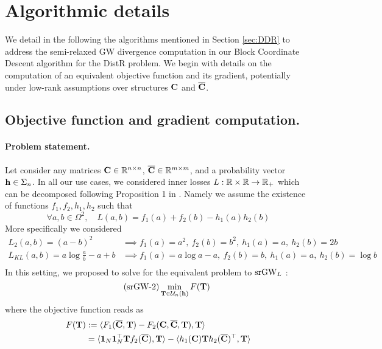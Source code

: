 \section{Algorithmic details}\label{sec:algorithms}

We detail in the following the algorithms mentioned in Section \ref{sec:DDR} to address the semi-relaxed GW divergence computation in our Block Coordinate Descent algorithm for the DistR problem. We begin with details on the computation of an equivalent objective function and its gradient, potentially under low-rank assumptions over structures ${\mathbf{C}}$ and $\overline{{\mathbf{C}}}$.

\subsection{Objective function and gradient computation.}\label{subsec:GWloss} 

\paragraph{Problem statement.} Let consider any matrices ${\mathbf{C}} \in \mathbb{R}^{n \times n}$, $\overline{{\mathbf{C}}} \in \mathbb{R}^{m \times m}$, and a probability vector ${\mathbf{h}} \in \Sigma_n$. In all our use cases,  we considered inner losses $L: \mathbb{R} \times \mathbb{R} \rightarrow \mathbb{R}_+$ which can be decomposed following Proposition 1 in \cite{peyre2016gromov}. Namely we assume the existence of functions $f_1, f_2, h_1, h_2$ such that 
\begin{equation}\label{eq:loss_decomposition}
\forall a, b \in \Omega^2, \quad L(a, b) = f_1(a) + f_2(b) - h_1(a) h_2(b)
\end{equation}
More specifically we considered
\begin{equation} \tag{L2}\label{eq:L2_loss}
\begin{split}
	L_2(a,b) = (a-b)^2 &\implies f_1(a) = a^2, \: f_2(b) = b^2, \: h_1(a) = a, \: h_2(b) = 2b \\
	L_{KL}(a,b ) = a \log \frac{a}{b} - a +b &\implies f_1(a) = a \log a -a, \: f_2(b) = b, \: h_1(a) = a, \: h_2(b) = \log b \\
\end{split}
\end{equation}
In this setting, we proposed to solve for the equivalent problem to $\operatorname{srGW}_L$ :
\begin{equation}\label{eq:srgw_eqpb}\tag{srGW-2}
\min_{{\mathbf{T}} \in \mathcal{U}_n({\mathbf{h}})} F({\mathbf{T}})
\end{equation}
where the objective function reads as 
\begin{equation}\label{eq:expressionF}
\begin{split}
	F({\mathbf{T}}) &:= \langle F_1(\overline{{\mathbf{C}}}, {\mathbf{T}}) - F_2({\mathbf{C}}, \overline{{\mathbf{C}}}, {\mathbf{T}}) , {\mathbf{T}} \rangle \\ 
	&= \langle \bm{1}_N \bm{1}_N^\top {\mathbf{T}} f_2(\overline{{\mathbf{C}}}) ,  {\mathbf{T}} \rangle - \langle h_1({\mathbf{C}}) {\mathbf{T}} h_2(\overline{{\mathbf{C}}})^\top , {\mathbf{T}} \rangle
\end{split}
\end{equation}

